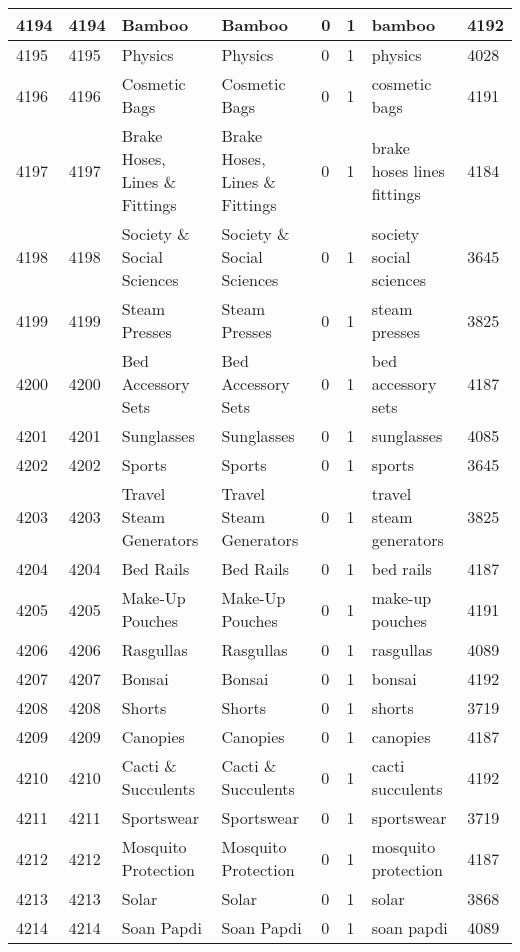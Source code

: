 \begin{longtable}{|l|l|l|l|l|l|l|l|}
4194 & 4194 & Bamboo & Bamboo & 0 & 1 & bamboo & 4192 \\ \hline 
4195 & 4195 & Physics & Physics & 0 & 1 & physics & 4028 \\ \hline 
4196 & 4196 & Cosmetic Bags & Cosmetic Bags & 0 & 1 & cosmetic bags & 4191 \\ \hline 
4197 & 4197 & Brake Hoses, Lines \& Fittings & Brake Hoses, Lines \& Fittings & 0 & 1 & brake hoses lines fittings & 4184 \\ \hline 
4198 & 4198 & Society \& Social Sciences & Society \& Social Sciences & 0 & 1 & society social sciences & 3645 \\ \hline 
4199 & 4199 & Steam Presses & Steam Presses & 0 & 1 & steam presses & 3825 \\ \hline 
4200 & 4200 & Bed Accessory Sets & Bed Accessory Sets & 0 & 1 & bed accessory sets & 4187 \\ \hline 
4201 & 4201 & Sunglasses & Sunglasses & 0 & 1 & sunglasses & 4085 \\ \hline 
4202 & 4202 & Sports & Sports & 0 & 1 & sports & 3645 \\ \hline 
4203 & 4203 & Travel Steam Generators & Travel Steam Generators & 0 & 1 & travel steam generators & 3825 \\ \hline 
4204 & 4204 & Bed Rails & Bed Rails & 0 & 1 & bed rails & 4187 \\ \hline 
4205 & 4205 & Make-Up Pouches & Make-Up Pouches & 0 & 1 & make-up pouches & 4191 \\ \hline 
4206 & 4206 & Rasgullas & Rasgullas & 0 & 1 & rasgullas & 4089 \\ \hline 
4207 & 4207 & Bonsai & Bonsai & 0 & 1 & bonsai & 4192 \\ \hline 
4208 & 4208 & Shorts & Shorts & 0 & 1 & shorts & 3719 \\ \hline 
4209 & 4209 & Canopies & Canopies & 0 & 1 & canopies & 4187 \\ \hline 
4210 & 4210 & Cacti \& Succulents & Cacti \& Succulents & 0 & 1 & cacti succulents & 4192 \\ \hline 
4211 & 4211 & Sportswear & Sportswear & 0 & 1 & sportswear & 3719 \\ \hline 
4212 & 4212 & Mosquito Protection & Mosquito Protection & 0 & 1 & mosquito protection & 4187 \\ \hline 
4213 & 4213 & Solar & Solar & 0 & 1 & solar & 3868 \\ \hline 
4214 & 4214 & Soan Papdi & Soan Papdi & 0 & 1 & soan papdi & 4089 \\ \hline 

\end{longtable}
